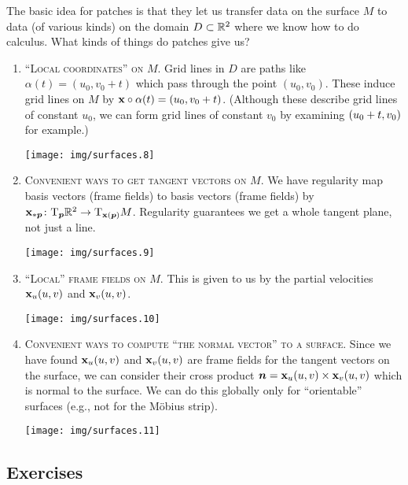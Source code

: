 The basic idea for patches is that they let us transfer data on the
surface $M$ to data (of various kinds) on the domain $D\subset\mathbb{R}^{2}$
where we know how to do calculus. What kinds of things do patches give
us?
\begin{enumerate}
\item \textsc{``Local coordinates'' on $M$.} Grid lines in $D$ are paths like
  $\alpha(t)=(u_{0},v_{0}+t)$ which pass through the point
  $(u_{0},v_{0})$. These induce grid lines on $M$ by
  $\mathbf{x}\circ\alpha(t)=\mathbf{(}u_{0},v_{0}+t)$. (Although these
  describe grid lines of constant $u_{0}$, we can form grid lines of
  constant $v_{0}$ by examining $\mathbf{(}u_{0}+t,v_{0})$ for example.)
  \begin{center}
    \texttt{[image: img/surfaces.8]}
  \end{center}
\item \textsc{Convenient ways to get tangent vectors on $M$.} We have
  regularity map basis vectors (frame fields) to basis vectors (frame
  fields) by $\mathbf{x}_{*\boldsymbol{p}}\colon\mathrm{T}_{\boldsymbol{p}}\mathbb{R}^{2}\to\mathrm{T}_{\mathbf{x}(\boldsymbol{p})}M$.
  Regularity guarantees we get a whole tangent plane, not just a line.
  \begin{center}
    \texttt{[image: img/surfaces.9]}
  \end{center}
\item \textsc{``Local'' frame fields on $M$.} This is given to us by the
  partial velocities $\mathbf{x}_{u}(u,v)$ and $\mathbf{x}_{v}(u,v)$.
  \begin{center}
    \texttt{[image: img/surfaces.10]}
  \end{center}
\item \textsc{Convenient ways to compute ``the normal vector'' to a surface.}
  Since we have found $\mathbf{x}_{u}(u,v)$ and $\mathbf{x}_{v}(u,v)$ are
  frame fields for the tangent vectors on the surface, we can consider
  their cross product
  $\boldsymbol{n}=\mathbf{x}_{u}(u,v)\times\mathbf{x}_{v}(u,v)$ which is normal
  to the surface.
  We can do this globally only for ``orientable'' surfaces (e.g., not
  for the M\"{o}bius strip).
  \begin{center}
    \texttt{[image: img/surfaces.11]}
  \end{center}
\end{enumerate}

\subsection*{Exercises}

